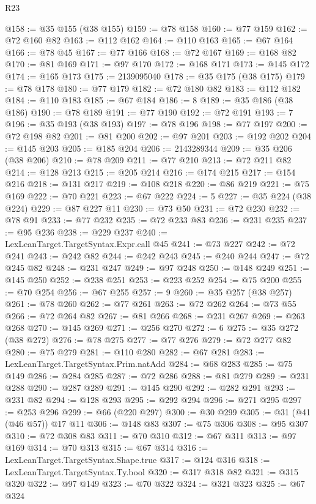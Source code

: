 \begin{lexlean}{R23}
\begin{coremodule}
@158 := @35 @155 (@38 @155)
@159 := @78 @158
@160 := @77 @159
@162 := @72 @160 @82
@163 := @112 @162
@164 := @110 @163
@165 := @67 @164
@166 := @78 @45
@167 := @77 @166
@168 := @72 @167
@169 := @168 @82
@170 := @81 @169
@171 := @97 @170
@172 := @168 @171
@173 := @145 @172
@174 := @165 @173
@175 := 2139095040
@178 := @35 @175 (@38 @175)
@179 := @78 @178
@180 := @77 @179
@182 := @72 @180 @82
@183 := @112 @182
@184 := @110 @183
@185 := @67 @184
@186 := 8
@189 := @35 @186 (@38 @186)
@190 := @78 @189
@191 := @77 @190
@192 := @72 @191
@193 := 7
@196 := @35 @193 (@38 @193)
@197 := @78 @196
@198 := @77 @197
@200 := @72 @198 @82
@201 := @81 @200
@202 := @97 @201
@203 := @192 @202
@204 := @145 @203
@205 := @185 @204
@206 := 2143289344
@209 := @35 @206 (@38 @206)
@210 := @78 @209
@211 := @77 @210
@213 := @72 @211 @82
@214 := @128 @213
@215 := @205 @214
@216 := @174 @215
@217 := @154 @216
@218 := @131 @217
@219 := @108 @218
@220 := @86 @219
@221 := @75 @169
@222 := @70 @221
@223 := @67 @222
@224 := 5
@227 := @35 @224 (@38 @224)
@229 := @87 @227 @11
@230 := @73 @50
@231 := @72 @230
@232 := @78 @91
@233 := @77 @232
@235 := @72 @233 @83
@236 := @231 @235
@237 := @95 @236
@238 := @229 @237
@240 := LexLeanTarget.TargetSyntax.Expr.call @45
@241 := @73 @227
@242 := @72 @241
@243 := @242 @82
@244 := @242 @243
@245 := @240 @244
@247 := @72 @245 @82
@248 := @231 @247
@249 := @97 @248
@250 := @148 @249
@251 := @145 @250
@252 := @238 @251
@253 := @223 @252
@254 := @75 @200
@255 := @70 @254
@256 := @67 @255
@257 := 9
@260 := @35 @257 (@38 @257)
@261 := @78 @260
@262 := @77 @261
@263 := @72 @262
@264 := @73 @55
@266 := @72 @264 @82
@267 := @81 @266
@268 := @231 @267
@269 := @263 @268
@270 := @145 @269
@271 := @256 @270
@272 := 6
@275 := @35 @272 (@38 @272)
@276 := @78 @275
@277 := @77 @276
@279 := @72 @277 @82
@280 := @75 @279
@281 := @110 @280
@282 := @67 @281
@283 := LexLeanTarget.TargetSyntax.Prim.natAdd
@284 := @68 @283
@285 := @75 @149
@286 := @284 @285
@287 := @72 @286
@288 := @81 @279
@289 := @231 @288
@290 := @287 @289
@291 := @145 @290
@292 := @282 @291
@293 := @231 @82
@294 := @128 @293
@295 := @292 @294
@296 := @271 @295
@297 := @253 @296
@299 := @66 (@220 @297)
@300 := @30 @299
@305 := @31 (@41 (@46 @57)) @17 @11
@306 := @148 @83
@307 := @75 @306
@308 := @95 @307
@310 := @72 @308 @83
@311 := @70 @310
@312 := @67 @311
@313 := @97 @169
@314 := @70 @313
@315 := @67 @314
@316 := LexLeanTarget.TargetSyntax.Shape.true
@317 := @124 @316
@318 := LexLeanTarget.TargetSyntax.Ty.bool
@320 := @317 @318 @82
@321 := @315 @320
@322 := @97 @149
@323 := @70 @322
@324 := @321 @323
@325 := @67 @324

\end{coremodule}
\end{lexlean}
